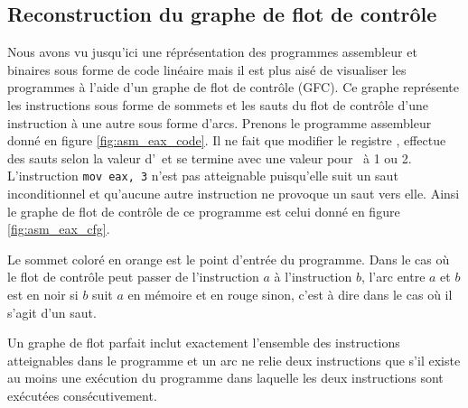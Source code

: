 \subsection{Reconstruction du graphe de flot de contrôle}
Nous avons vu jusqu'ici une réprésentation des programmes assembleur et binaires sous forme de code linéaire mais il est plus aisé de visualiser les programmes à l'aide d'un graphe de flot de contrôle (GFC).
Ce graphe représente les instructions sous forme de sommets et les sauts du flot de contrôle d'une instruction à une autre sous forme d'arcs.
Prenons le programme assembleur donné en figure \ref{fig:asm_eax_code}. Il ne fait que modifier le registre \eax, effectue des sauts selon la valeur d'\eax\ et se termine avec une valeur pour \eax\ à 1 ou 2. L'instruction \texttt{mov eax, 3} n'est pas atteignable puisqu'elle suit un saut inconditionnel et qu'aucune autre instruction ne provoque un saut vers elle.
Ainsi le graphe de flot de contrôle de ce programme est celui donné en figure \ref{fig:asm_eax_cfg}.

Le sommet coloré en orange est le point d'entrée du programme. Dans le cas où le flot de contrôle peut passer de l'instruction $a$ à l'instruction $b$, l'arc entre $a$ et $b$ est en noir si $b$ suit $a$ en mémoire et en rouge sinon, c'est à dire dans le cas où il s'agit d'un saut.

Un graphe de flot parfait inclut exactement l'ensemble des instructions atteignables dans le programme et un arc ne relie deux instructions que s'il existe au moins une exécution du programme dans laquelle les deux instructions sont exécutées consécutivement.

